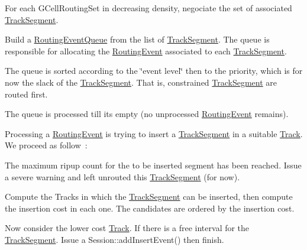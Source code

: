 For each {\ttfamily G\+Cell\+Routing\+Set} in decreasing density, negociate the set of associated {\ttfamily \hyperlink{classKite_1_1TrackSegment}{Track\+Segment}}. 
\begin{DoxyEnumerate}
\item Build a {\ttfamily \hyperlink{classKite_1_1RoutingEventQueue}{Routing\+Event\+Queue}} from the list of {\ttfamily \hyperlink{classKite_1_1TrackSegment}{Track\+Segment}}. The queue is responsible for allocating the {\ttfamily \hyperlink{classKite_1_1RoutingEvent}{Routing\+Event}} associated to each {\ttfamily \hyperlink{classKite_1_1TrackSegment}{Track\+Segment}}. 
\item The queue is sorted according to the \char`\"{}event level\char`\"{} then to the priority, which is for now the slack of the {\ttfamily \hyperlink{classKite_1_1TrackSegment}{Track\+Segment}}. That is, constrained {\ttfamily \hyperlink{classKite_1_1TrackSegment}{Track\+Segment}} are routed first. 
\item The queue is processed till it\textquotesingle{}s empty (no unprocessed {\ttfamily \hyperlink{classKite_1_1RoutingEvent}{Routing\+Event}} remains).

Processing a {\ttfamily \hyperlink{classKite_1_1RoutingEvent}{Routing\+Event}} is trying to insert a {\ttfamily \hyperlink{classKite_1_1TrackSegment}{Track\+Segment}} in a suitable \hyperlink{classKite_1_1Track}{Track}. We proceed as follow~\+: 
\begin{DoxyItemize}
\item The maximum ripup count for the to be inserted segment has been reached. Issue a severe warning and left unrouted this {\ttfamily \hyperlink{classKite_1_1TrackSegment}{Track\+Segment}} (for now). 
\item Compute the Tracks in which the {\ttfamily \hyperlink{classKite_1_1TrackSegment}{Track\+Segment}} can be inserted, then compute the insertion cost in each one. The candidates are ordered by the insertion cost. 
\item Now consider the lower cost {\ttfamily \hyperlink{classKite_1_1Track}{Track}}. If there is a free interval for the {\ttfamily \hyperlink{classKite_1_1TrackSegment}{Track\+Segment}}. Issue a {\ttfamily Session\+::add\+Insert\+Event()} then finish.


\end{DoxyItemize}
\end{DoxyEnumerate}
